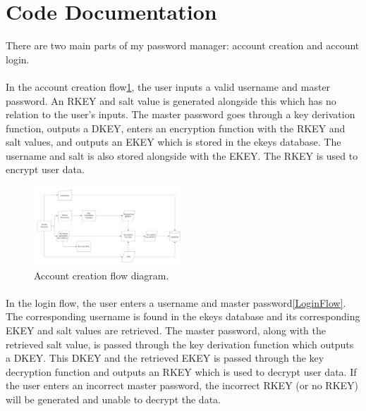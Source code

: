 \documentclass[10pt,twocolumn]{article}
\begin{document}
\section{Code Documentation}


There are two main parts of my password manager: account creation and account login.

\paragraph{}
In the account creation flow\ref{AccountCreation}, the user inputs a valid username and master password. An RKEY and salt value is generated alongside this which has no relation to the user's inputs. The master password goes through a key derivation function, outputs a DKEY, enters an encryption function with the RKEY and salt values, and outputs an EKEY which is stored in the ekeys database. The username and salt is also stored alongside with the EKEY. The RKEY is used to encrypt user data.

\begin{figure}[h]
    \centering
    \includegraphics[width=0.5\textwidth]{Account Creation Flow.png}
    \caption{Account creation flow diagram.}
    \label{AccountCreation}
\end{figure}

\paragraph{}
In the login flow, the user enters a username and master password\ref{LoginFlow}. The corresponding username is found in the ekeys database and its corresponding EKEY and salt values are retrieved. The master password, along with the retrieved salt value, is passed through the key derivation function which outputs a DKEY. This DKEY and the retrieved EKEY is passed through the key decryption function and outputs an RKEY which is used to decrypt user data. If the user enters an incorrect master password, the incorrect RKEY (or no RKEY) will be generated and unable to decrypt the data.
\end{document}
